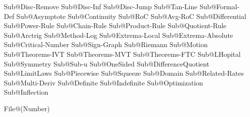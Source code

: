 Sub@Disc-Remove 			%
Sub@Disc-Inf				%
Sub@Disc-Jump				%
Sub@Tan-Line				%
Sub@Formal-Def				%
Sub@Asymptote				%
Sub@Continuity				%
Sub@RoC						%
Sub@Avg-RoC					%
Sub@Differential			%
Sub@Power-Rule				%
Sub@Chain-Rule				%
Sub@Product-Rule			%
Sub@Quotient-Rule			%
Sub@Arctrig					%
Sub@Method-Log				%
Sub@Extrema-Local			%
Sub@Extrema-Absolute		%
Sub@Critical-Number			%
Sub@Sign-Graph				%
Sub@Riemann					%
Sub@Motion					%
Sub@Theorems-IVT			%
Sub@Theorems-MVT			%
Sub@Theorems-FTC			%
Sub@LHopital				%
Sub@Symmetry				%
Sub@Sub-u					%
Sub@OneSided				%
Sub@DifferenceQuotient		%
Sub@LimitLaws				%
Sub@Piecewise				%
Sub@Squeeze					%
Sub@Domain					%
Sub@Related-Rates			%
Sub@Multi-Deriv				%
Sub@Definite				%
Sub@Indefinite				%
Sub@Optimization			%
Sub@Inflection				%







File@(Number) %





